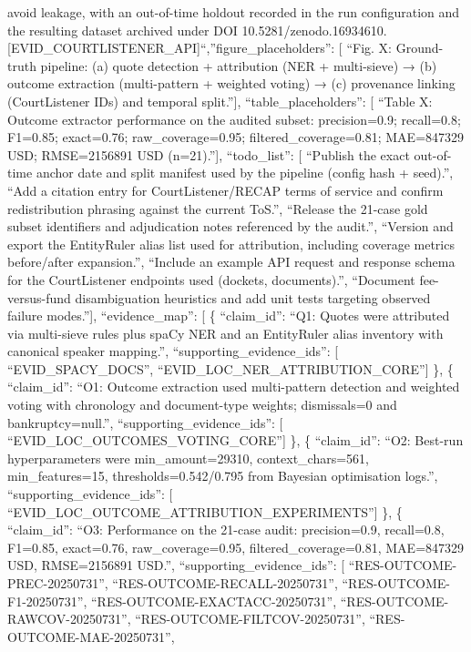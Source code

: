 avoid leakage, with an out-of-time holdout recorded in the run configuration and the resulting dataset archived under DOI 10.5281/zenodo.16934610. {[}EVID\_COURTLISTENER\_API{]}\n``,''figure\_placeholders'': {[}
``Fig. X: Ground-truth pipeline: (a) quote detection + attribution (NER + multi-sieve) → (b) outcome extraction (multi-pattern + weighted voting) → (c) provenance linking (CourtListener IDs) and temporal split.''{]},
``table\_placeholders'': {[}
``Table X: Outcome extractor performance on the audited subset: precision=0.9; recall=0.8; F1=0.85; exact=0.76; raw\_coverage=0.95; filtered\_coverage=0.81; MAE=847329 USD; RMSE=2156891 USD (n=21).''{]},
``todo\_list'': {[}
``Publish the exact out-of-time anchor date and split manifest used by the pipeline (config hash + seed).'',
``Add a citation entry for CourtListener/RECAP terms of service and confirm redistribution phrasing against the current ToS.'',
``Release the 21-case gold subset identifiers and adjudication notes referenced by the audit.'',
``Version and export the EntityRuler alias list used for attribution, including coverage metrics before/after expansion.'',
``Include an example API request and response schema for the CourtListener endpoints used (dockets, documents).'',
``Document fee-versus-fund disambiguation heuristics and add unit tests targeting observed failure modes.''{]},
``evidence\_map'': {[}
\{
``claim\_id'': ``Q1: Quotes were attributed via multi-sieve rules plus spaCy NER and an EntityRuler alias inventory with canonical speaker mapping.'',
``supporting\_evidence\_ids'': {[}
``EVID\_SPACY\_DOCS'',
``EVID\_LOC\_NER\_ATTRIBUTION\_CORE''{]}
\},
\{
``claim\_id'': ``O1: Outcome extraction used multi-pattern detection and weighted voting with chronology and document-type weights; dismissals=0 and bankruptcy=null.'',
``supporting\_evidence\_ids'': {[}
``EVID\_LOC\_OUTCOMES\_VOTING\_CORE''{]}
\},
\{
``claim\_id'': ``O2: Best-run hyperparameters were min\_amount=29310, context\_chars=561, min\_features=15, thresholds=0.542/0.795 from Bayesian optimisation logs.'',
``supporting\_evidence\_ids'': {[}
``EVID\_LOC\_OUTCOME\_ATTRIBUTION\_EXPERIMENTS''{]}
\},
\{
``claim\_id'': ``O3: Performance on the 21-case audit: precision=0.9, recall=0.8, F1=0.85, exact=0.76, raw\_coverage=0.95, filtered\_coverage=0.81, MAE=847329 USD, RMSE=2156891 USD.'',
``supporting\_evidence\_ids'': {[}
``RES-OUTCOME-PREC-20250731'',
``RES-OUTCOME-RECALL-20250731'',
``RES-OUTCOME-F1-20250731'',
``RES-OUTCOME-EXACTACC-20250731'',
``RES-OUTCOME-RAWCOV-20250731'',
``RES-OUTCOME-FILTCOV-20250731'',
``RES-OUTCOME-MAE-20250731'',
